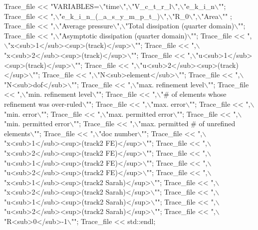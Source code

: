 \begin{DoxyCodeInclude}
{{{{{{{ Trace\_file << \textcolor{stringliteral}{"VARIABLES=\(\backslash\)"time\(\backslash\)",\(\backslash\)"V\_c\_t\_r\_l\(\backslash\)",\(\backslash\)"e\_k\_i\_n\(\backslash\)""};
 Trace\_file << \textcolor{stringliteral}{",\(\backslash\)"e\_k\_i\_n\_(\_a\_s\_y\_m\_p\_t\_)\(\backslash\)",\(\backslash\)"R\_0\(\backslash\)",\(\backslash\)"Area\(\backslash\)""} ;
 Trace\_file << \textcolor{stringliteral}{",\(\backslash\)"Average pressure\(\backslash\)",\(\backslash\)"Total dissipation (quarter domain)\(\backslash\)""};
 Trace\_file << \textcolor{stringliteral}{",\(\backslash\)"Asymptotic dissipation (quarter domain)\(\backslash\)""};
 Trace\_file << \textcolor{stringliteral}{",\(\backslash\)"x<sub>1</sub><sup>(track)</sup>\(\backslash\)""};
 Trace\_file << \textcolor{stringliteral}{",\(\backslash\)"x<sub>2</sub><sup>(track)</sup>\(\backslash\)""};
 Trace\_file << \textcolor{stringliteral}{",\(\backslash\)"u<sub>1</sub><sup>(track)</sup>\(\backslash\)""};
 Trace\_file << \textcolor{stringliteral}{",\(\backslash\)"u<sub>2</sub><sup>(track)</sup>\(\backslash\)""};
 Trace\_file << \textcolor{stringliteral}{",\(\backslash\)"N<sub>element</sub>\(\backslash\)""};
 Trace\_file << \textcolor{stringliteral}{",\(\backslash\)"N<sub>dof</sub>\(\backslash\)""};
 Trace\_file << \textcolor{stringliteral}{",\(\backslash\)"max. refinement level\(\backslash\)""};
 Trace\_file << \textcolor{stringliteral}{",\(\backslash\)"min. refinement level\(\backslash\)""};
 Trace\_file << \textcolor{stringliteral}{",\(\backslash\)"# of elements whose refinement was over-ruled\(\backslash\)""};
 Trace\_file << \textcolor{stringliteral}{",\(\backslash\)"max. error\(\backslash\)""};
 Trace\_file << \textcolor{stringliteral}{",\(\backslash\)"min. error\(\backslash\)""};
 Trace\_file << \textcolor{stringliteral}{",\(\backslash\)"max. permitted error\(\backslash\)""};
 Trace\_file << \textcolor{stringliteral}{",\(\backslash\)"min. permitted error\(\backslash\)""};
 Trace\_file << \textcolor{stringliteral}{",\(\backslash\)"max. permitted # of unrefined elements\(\backslash\)""};
 Trace\_file << \textcolor{stringliteral}{",\(\backslash\)"doc number\(\backslash\)""};
 Trace\_file << \textcolor{stringliteral}{",\(\backslash\)"x<sub>1</sub><sup>(track2 FE)</sup>\(\backslash\)""};
 Trace\_file << \textcolor{stringliteral}{",\(\backslash\)"x<sub>2</sub><sup>(track2 FE)</sup>\(\backslash\)""};
 Trace\_file << \textcolor{stringliteral}{",\(\backslash\)"u<sub>1</sub><sup>(track2 FE)</sup>\(\backslash\)""};
 Trace\_file << \textcolor{stringliteral}{",\(\backslash\)"u<sub>2</sub><sup>(track2 FE)</sup>\(\backslash\)""};
 Trace\_file << \textcolor{stringliteral}{",\(\backslash\)"x<sub>1</sub><sup>(track2 Sarah)</sup>\(\backslash\)""};
 Trace\_file << \textcolor{stringliteral}{",\(\backslash\)"x<sub>2</sub><sup>(track2 Sarah)</sup>\(\backslash\)""};
 Trace\_file << \textcolor{stringliteral}{",\(\backslash\)"u<sub>1</sub><sup>(track2 Sarah)</sup>\(\backslash\)""};
 Trace\_file << \textcolor{stringliteral}{",\(\backslash\)"u<sub>2</sub><sup>(track2 Sarah)</sup>\(\backslash\)""};
 Trace\_file << \textcolor{stringliteral}{",\(\backslash\)"R<sub>0</sub>-1\(\backslash\)""};
 Trace\_file << std::endl;

}}}}}}}
\end{DoxyCodeInclude}
